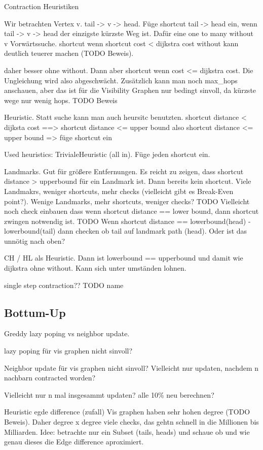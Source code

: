 Contraction Heuristiken

Wir betrachten Vertex v. tail -> v -> head.
Füge shortcut tail -> head ein, wenn tail -> v -> head der einzigste kürzste Weg ist.
Dafür eine one to many without v Vorwärtssuche.
shortcut wenn shortcut cost < dijkstra cost
without kann deutlich teuerer machen (TODO Beweis).

daher besser ohne without. Dann aber shortcut wenn cost <= dijkstra cost.
Die Ungleichung wird also abgeschwächt.
Zusätzlich kann man noch max\_hops anschauen, aber das ist für die Visibility Graphen nur bedingt sinvoll, da kürzste wege nur wenig hops. TODO Beweis

Heuristic.
Statt suche kann man auch heursitc benutzten.
shortcut distance < dijksta cost ==> shortcut distance <= upper bound
also shortcut distance <= upper bound => füge shortcut ein

Used heuristics:
TrivialeHeuristic (all in). Füge jeden shortcut ein.

Landmarks. Gut für größere Entfernungen.
Es reicht zu zeigen, dass shortcut distance > upperbound für ein Landmark ist. Dann bereits kein shortcut.
Viele Landmakrs, weniger shortcuts, mehr checks (vielleicht gibt es Break-Even point?). Wenige Landmarks, mehr shortcuts, weniger checks?
TODO Vielleicht noch check einbauen dass wenn shortcut distance == lower bound, dann shortcut zwingen notwendig ist.
TODO Wenn shortcut distance == lowerbound(head) - lowerbound(tail) dann checken ob tail auf landmark path (head). Oder ist das unnötig nach oben?

CH / HL als Heuristic.
Dann ist lowerbound == upperbound und damit wie dijkstra ohne without. Kann sich unter umständen lohnen.


single step contraction?? TODO name

\subsection{Bottum-Up}

Greddy lazy poping vs neighbor update.

lazy poping für vis graphen nicht sinvoll?

Neighbor update für vis graphen nicht sinvoll?
Vielleicht nur updaten, nachdem n nachbarn contracted worden?

Vielleicht nur n mal insgesammt updaten? alle 10\% neu berechnen?



Heuristic egde difference (zufall)
Vis graphen haben sehr hohen degree (TODO Beweis).
Daher degree x degree viele checks, das gehtn schnell in die Millionen bis Milliarden.
Idee: betrachte nur ein Subset (tails, heads) und schaue ob und wie genau dieses die Edge difference aproximiert.

